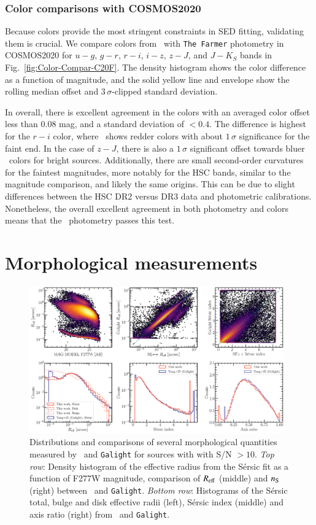 \documentclass[longauth]{aa}
\begin{document}
\subsubsection{Color comparisons with COSMOS2020} 
Because colors provide the most stringent constraints in SED fitting, validating them is crucial. We compare colors from \SEpp\ with \texttt{The Farmer} photometry in COSMOS2020 for $u-g$, $g-r$, $r-i$, $i-z$, $z-J$, and $J-K_{S}$ bands in Fig.~\ref{fig:Color-Compar-C20F}. The density histogram shows the color difference as a function of magnitude, and the solid yellow line and envelope show the rolling median offset and $3\,\sigma$-clipped standard deviation. 

In overall, there is excellent agreement in the colors with an averaged color offset less than $0.08$ mag, and a standard deviation of $<0.4$. The difference is highest for the $r-i$ color, where \SEpp\ shows redder colors with about $1\, \sigma$ significance for the faint end. In the case of $z-J$, there is also a $1\, \sigma$ significant offset towards bluer \SEpp\ colors for bright sources. Additionally, there are small second-order curvatures for the faintest magnitudes, more notably for the HSC bands, similar to the magnitude comparison, and likely the same origins. This can be due to slight differences between the HSC DR2 versus DR3 data and photometric calibrations. Nonetheless, the overall excellent agreement in both photometry and colors means that the \SEpp\ photometry passes this test.

\section{Morphological measurements} \label{sec:morphology}

\begin{figure}[t!]
\centering
\includegraphics[width=0.98\textwidth]{figures/Morphology_distributions.pdf}
\caption{Distributions and comparisons of several morphological quantities measured by \SEpp\ and \texttt{Galight} for sources with with S/N $> 10$. \textit{Top row}: Density histogram of the effective radius from the S\'ersic fit as a function of F277W magnitude, comparison of $R_{\rm eff}$ (middle) and $n_{\rm S}$ (right) between \SEpp\ and \texttt{Galight}. \textit{Bottom row}: Histograms of the S\'ersic total, bulge and disk effective radii (left),  S\'ersic index (middle) and axis ratio (right) from \SEpp\ and \texttt{Galight}.}
\label{fig:Morpho-distributions}
\end{figure}
\end{document}
